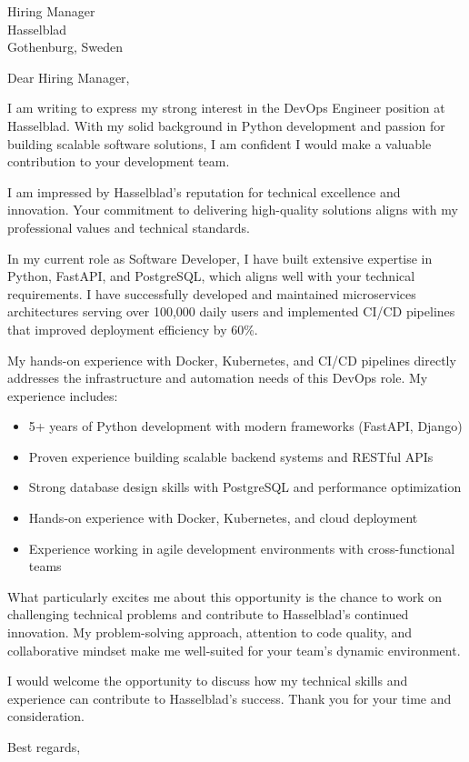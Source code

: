 \documentclass[11pt,a4paper]{letter}
\begin{document}
\begin{letter}{Hiring Manager \\ Hasselblad \\ Gothenburg, Sweden}

\opening{Dear Hiring Manager,}

I am writing to express my strong interest in the DevOps Engineer position at Hasselblad. With my solid background in Python development and passion for building scalable software solutions, I am confident I would make a valuable contribution to your development team.

I am impressed by Hasselblad's reputation for technical excellence and innovation. Your commitment to delivering high-quality solutions aligns with my professional values and technical standards.

In my current role as Software Developer, I have built extensive expertise in Python, FastAPI, and PostgreSQL, which aligns well with your technical requirements. I have successfully developed and maintained microservices architectures serving over 100,000 daily users and implemented CI/CD pipelines that improved deployment efficiency by 60\%.

My hands-on experience with Docker, Kubernetes, and CI/CD pipelines directly addresses the infrastructure and automation needs of this DevOps role. My experience includes:

\begin{itemize}
\item 5+ years of Python development with modern frameworks (FastAPI, Django)
\item Proven experience building scalable backend systems and RESTful APIs
\item Strong database design skills with PostgreSQL and performance optimization
\item Hands-on experience with Docker, Kubernetes, and cloud deployment
\item Experience working in agile development environments with cross-functional teams
\end{itemize}

What particularly excites me about this opportunity is the chance to work on challenging technical problems and contribute to Hasselblad's continued innovation. My problem-solving approach, attention to code quality, and collaborative mindset make me well-suited for your team's dynamic environment.

I would welcome the opportunity to discuss how my technical skills and experience can contribute to Hasselblad's success. Thank you for your time and consideration.

\closing{Best regards,}

\end{letter}
\end{document}

